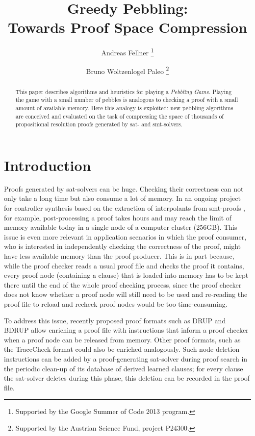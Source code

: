 \documentclass{llncs}
\title{Greedy Pebbling: \\ 
Towards Proof Space Compression}
\author{
  Andreas Fellner 
  \thanks{Supported by the Google Summer of Code 2013 program.}
  \and 
  Bruno Woltzenlogel Paleo 
  \thanks{Supported by the Austrian Science Fund, project P24300.}
}
\institute{
  \email{fellner.a@gmail.com} \ \ \ \email{bruno@logic.at} \\
  Theory and Logic Group \\
  Institute for Computer Languages \\
  Vienna University of Technology
}
\begin{document}
\maketitle

\begin{abstract}
This paper describes algorithms and heuristics for playing a \emph{Pebbling Game}. Playing the game with a small number of pebbles is analogous to checking a proof with a small amount of available memory. Here this analogy is exploited: new pebbling algorithms are conceived and evaluated on the task of compressing the space of thousands of propositional resolution proofs generated by sat- and smt-solvers.
\end{abstract}

\setcounter{footnote}{0}


\section{Introduction}

Proofs generated by sat-solvers can be huge. 
Checking their correctness can not only take a long time but also consume a lot of memory. 
In an ongoing project for controller synthesis based on the extraction of interpolants from smt-proofs \cite{Hofferek}, 
for example, post-processing a proof takes hours and may reach the limit of memory available today in a single node of a computer cluster (256GB). This issue is even more relevant in application scenarios in which the proof consumer, who is interested in independently checking the correctness of the proof, might have less available memory than the proof producer.
This is in part because, while the proof checker reads a usual proof file and checks the proof it contains, 
every proof node (containing a clause) that is loaded into memory has to be kept there until the end of the whole proof checking process, 
since the proof checker does not know whether a proof node will still need to be used and re-reading the proof file to reload and recheck proof nodes would be too time-consuming. 

To address this issue, recently proposed proof formats such as DRUP \cite{drup} and BDRUP \cite{bdrup} allow enriching a proof file with instructions that inform a proof checker when a proof node can be released from memory. Other proof formats, such as the TraceCheck format \cite{tracecheck} could also be enriched analogously. Such node deletion instructions can be added by a proof-generating sat-solver during proof search in the periodic clean-up of its database of derived learned clauses; for every clause the sat-solver deletes during this phase, this deletion can be recorded in the proof file. 
\end{document}
